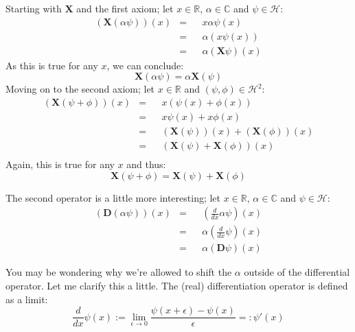 \documentclass[solutions.tex]{subfiles}
\begin{document}
Starting with $\bm{X}$ and the first axiom; let $x\in\mathbb{R}$,
$\alpha\in\mathbb{C}$ and $\psi\in\mathcal{H}$:
\begin{equation*}\begin{aligned}
	(\bm{X}(\alpha\psi))(x) &=&& x\alpha\psi(x) \\
	~ &=&& \alpha(x\psi(x)) \\
	~ &=&& \alpha(\bm{X}\psi)(x)
\end{aligned}\end{equation*}
As this is true for any $x$, we can conclude:
\[
	\boxed{\bm{X}(\alpha\psi) = \alpha\bm{X}(\psi)}
\]
Moving on to the second axiom; let $x\in\mathbb{R}$ and $(\psi,\phi)\in\mathcal{H}^2$:
\begin{equation*}\begin{aligned}
	(\bm{X}(\psi+\phi))(x) &=&& x(\psi(x)+\phi(x)) \\
	~ &=&& x\psi(x) + x\phi(x) \\
	~ &=&& (\bm{X}(\psi))(x) + (\bm{X}(\phi))(x) \\
	~ &=&& (\bm{X}(\psi) + \bm{X}(\phi))(x) \\
\end{aligned}\end{equation*}
Again, this is true for any $x$ and thus:
\[
	\boxed{\bm{X}(\psi+\phi) = \bm{X}(\psi) + \bm{X}(\phi)}
\]

\hr

The second operator is a little more interesting; let $x\in\mathbb{R}$,
$\alpha\in\mathbb{C}$ and $\psi\in\mathcal{H}$:
\begin{equation*}\begin{aligned}
	(\bm{D}(\alpha\psi))(x) &=&& (\frac{d}{dx}\alpha\psi)(x) \\
	~ &=&& \alpha(\frac{d}{dx}\psi)(x) \\
	~ &=&& \alpha(\bm{D}\psi)(x)
\end{aligned}\end{equation*}

You may be wondering why we're allowed to shift the $\alpha$ outside of the
differential operator. Let me clarify this a little. The (real) differentiation
operator is defined as a limit:
\[
	\frac{d}{dx}\psi(x) := \lim_{\epsilon\rightarrow 0}
	\frac{\psi(x+\epsilon)-\psi(x)}{\epsilon} =: \psi'(x)
\]
\end{document}
